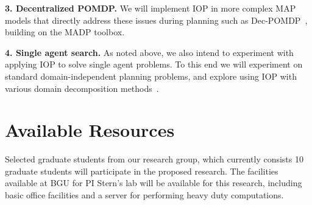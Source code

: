 \documentclass[11pt]{article}
\begin{document}
{\bf 3. Decentralized POMDP.} We will implement IOP in more complex MAP models that directly address these issues during planning such as Dec-POMDP~\cite{bernstein2002complexity}, building on the MADP toolbox.  %



{\bf 4. Single agent search.} As noted above, we also intend to experiment with applying IOP to solve single agent problems. To this end we will experiment on standard domain-independent planning problems, and explore  using IOP with various domain decomposition methods~\cite{nissim2012tunneling,amir2003factored}. 








\section{Available Resources}
Selected graduate students from our research group, which  currently consists 10 graduate students will participate in the proposed research. The facilities available at BGU for PI Stern's lab will be available for this research, including basic office facilities and a server for performing heavy duty computations. 







\pagebreak
\small

%

\end{document}

